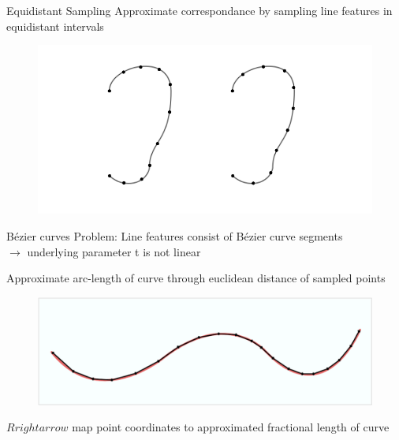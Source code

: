 \documentclass[xcolor=x11names,compress]{beamer}
\begin{document}
    \begin{frame}{Equidistant Sampling}
        Approximate correspondance by sampling line features in equidistant intervals
        \begin{figure}
            \centering
            \includegraphics[width=.7\textwidth]{../resources/figures/ears_diffparam.pdf}
        \end{figure}
    \end{frame}

    \begin{frame}{B\'{e}zier curves}
        Problem: Line features consist of B\'{e}zier curve segments\\
        $\rightarrow$ underlying parameter t is not linear

        Approximate arc-length of curve through euclidean distance of sampled points\\
        \begin{figure}
            \centering
            \includegraphics[width=.7\textwidth]{../resources/figures/distance_computation.pdf}
        \end{figure}
        $Rrightarrow$ map point coordinates to approximated fractional length of curve
    \end{frame}

\end{document}
